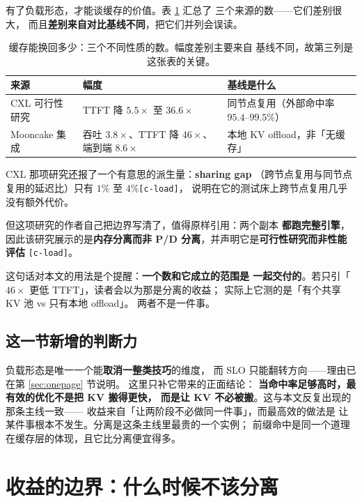 有了负载形态，才能谈缓存的价值。表 \ref{tab:load} 汇总了
三个来源的数——它们差别很大，
而且\textbf{差别来自对比基线不同}，把它们并列会误读。

\begin{table}[t]
\centering
\caption{缓存能换回多少：三个不同性质的数。幅度差别主要来自
基线不同，故第三列是这张表的关键。}
\label{tab:load}
\small
\setlength{\tabcolsep}{9pt}
\begin{tabular}{@{}p{4.06cm}p{3.75cm}p{7.82cm}@{}}
\toprule
来源 & 幅度 & 基线是什么 \\
\midrule
CXL 可行性研究 & TTFT 降 $5.5\times$ 至 $36.6\times$
  & 同节点复用（外部命中率 $95.4$--$99.5\%$） \\
Mooncake 集成 & 吞吐 $3.8\times$、TTFT 降 $46\times$、
  端到端 $8.6\times$ & 本地 KV offload，非「无缓存」 \\
\bottomrule
\end{tabular}
\end{table}

\noindent CXL 那项研究还报了一个有意思的派生量：\textbf{sharing gap}
（跨节点复用与同节点复用的延迟比）只有 $1\%$ 至 $4\%$\texttt{[c-load]}，
说明在它的测试床上跨节点复用几乎没有额外代价。

\noindent 但这项研究的作者自己把边界写清了，值得原样引用：两个副本
\textbf{都跑完整引擎}，因此该研究展示的是\textbf{内存分离而非
P/D 分离}，并声明它是\textbf{可行性研究而非性能评估}
\texttt{[c-load]}。

\noindent 这句话对本文的用法是个提醒：\textbf{一个数和它成立的范围是
一起交付的}。若只引「$46\times$ 更低 TTFT」，读者会以为那是分离的收益；
实际上它测的是「有个共享 KV 池 vs 只有本地 offload」。
两者不是一件事。

\subsection{这一节新增的判断力}

负载形态是唯一一个能\textbf{取消一整类技巧}的维度，
而 SLO 只能翻转方向——理由已在第 \ref{sec:onepage} 节说明。
这里只补它带来的正面结论：
\textbf{当命中率足够高时，最有效的优化不是把 KV 搬得更快，
而是让 KV 不必被搬}。这与本文反复出现的那条主线一致——
收益来自「让两阶段不必做同一件事」，而最高效的做法是
让某件事根本不发生。分离是这条主线里最贵的一个实例；
前缀命中是同一个道理在缓存层的体现，且它比分离便宜得多。

\section{收益的边界：什么时候不该分离}
\label{sec:boundary}

